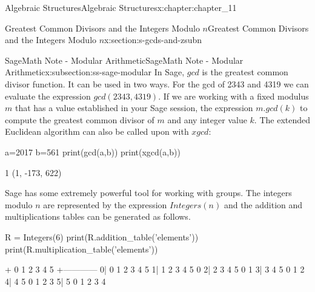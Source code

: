 \documentclass[twoside,10pt,]{book}
\numberwithin{equation}{section}
\begin{document}
\begin{chapterptx}{Algebraic Structures}{}{Algebraic Structures}{}{}{x:chapter:chapter_11}
\begin{sectionptx}{Greatest Common Divisors  and the Integers Modulo \(n\)}{}{Greatest Common Divisors  and the Integers Modulo \(n\)}{}{}{x:section:s-gcds-and-zsubn}
\begin{subsectionptx}{SageMath Note - Modular Arithmetic}{}{SageMath Note - Modular Arithmetic}{}{}{x:subsection:ss-sage-modular}
In Sage, \(gcd\) is the greatest common divisor function.  It can be used in two ways.  For the gcd of 2343 and 4319 we can evaluate the expression \(gcd(2343,4319)\).   If we are working with a fixed modulus \(m\) that has a value established in your Sage session, the expression \(m.gcd(k)\) to compute the greatest common divisor of \(m\) and any integer value \(k\). The extended Euclidean algorithm can also be called upon with \(xgcd\):%
\begin{sageinput}
a=2017
b=561
print(gcd(a,b))
print(xgcd(a,b))
\end{sageinput}
\begin{sageoutput}
1
(1, -173, 622)
\end{sageoutput}
Sage has some extremely powerful tool for working with groups.  The integers modulo \(n\) are represented by the expression \(Integers(n)\) and the addition and multiplications tables can be generated as follows.%
\begin{sageinput}
R = Integers(6)
print(R.addition_table('elements'))
print(R.multiplication_table('elements'))
\end{sageinput}
\begin{sageoutput}
+  0 1 2 3 4 5
 +------------  
0| 0 1 2 3 4 5
1| 1 2 3 4 5 0
2| 2 3 4 5 0 1
3| 3 4 5 0 1 2
4| 4 5 0 1 2 3
5| 5 0 1 2 3 4


\end{sageoutput}
\end{subsectionptx}
\end{sectionptx}
\end{chapterptx}
\end{document}
